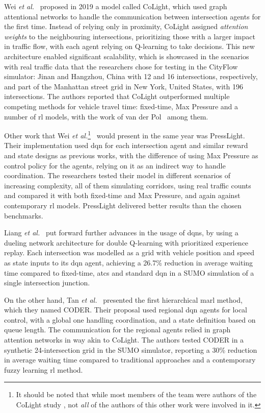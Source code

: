 Wei \textit{et al.}~\cite{Wei2019} proposed in 2019 a model called CoLight, which used graph attentional networks to handle the communication between intersection agents for the first time. Instead of relying only in proximity, CoLight assigned \textit{attention weights} to the neighbouring intersections, prioritizing those with a larger impact in traffic flow, with each agent relying on Q-learning to take decisions. This new architecture enabled significant scalability, which is showcased in the scenarios with real traffic data that the researchers chose for testing in the CityFlow simulator: Jinan and Hangzhou, China with 12 and 16 intersections, respectively, and part of the Manhattan street grid in New York, United States, with 196 intersections. The authors reported that CoLight outperformed multiple competing methods for vehicle travel time: fixed-time, Max Pressure and a number of \gls{rl} models, with the work of van der Pol~\cite{vanderPol2016} among them.

Other work that Wei \textit{et al.}\footnote{It should be noted that while most members of the team were authors of the CoLight study \cite{Wei2019}, not \textit{all} of the authors of this other work were involved in it.}~\cite{Wei2019b} would present in the same year was PressLight. Their implementation used \gls{dqn} for each intersection agent and similar reward and state designs as previous works, with the difference of using Max Pressure as control policy for the agents, relying on it as an indirect way to handle coordination. The researchers tested their model in different scenarios of increasing complexity, all of them simulating corridors, using real traffic counts and compared it with both fixed-time and Max Pressure, and again against contemporary \gls{rl} models. PressLight delivered better results than the chosen benchmarks.

Liang \textit{et al.}~\cite{Liang2019} put forward further advances in the usage of \gls{dqn}s, by using a dueling network architecture for double Q-learning with prioritized experience replay. Each intersection was modelled as a grid with vehicle position and speed as state inputs to its \gls{dqn} agent, achieving a 26.7\% reduction in average waiting time compared to fixed-time, \gls{atcs} and standard \gls{dqn} in a SUMO simulation of a single intersection junction.

On the other hand, Tan \textit{et al.}~\cite{Tan2019} presented the first hierarchical \gls{marl} method, which they named CODER. Their proposal used regional \gls{dqn} agents for local control, with a global one handling coordination, and a state definition based on queue length. The communication for the regional agents relied in graph attention networks in way akin to CoLight. The authors tested CODER in a synthetic 24-intersection grid in the SUMO simulator, reporting a 30\% reduction in average waiting time compared to traditional approaches and a contemporary fuzzy learning \gls{rl} method.

